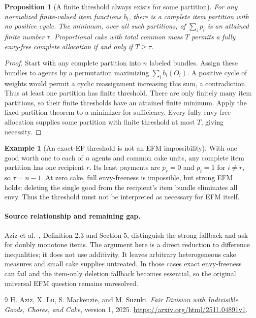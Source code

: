 \documentclass[11pt]{article}
\newtheorem{proposition}{Proposition}
\theoremstyle{definition}
\newtheorem{example}{Example}
\theoremstyle{remark}
\begin{document}
\begin{proposition}[A finite threshold always exists for some partition]
For any normalized finite-valued item functions $b_i$, there is a complete item partition with no positive cycle. The minimum, over all such partitions, of $\sum_i p_i$ is an attained finite number $\tau$. Proportional cake with total common mass $T$ permits a fully envy-free complete allocation if and only if $T\geq\tau$.
\end{proposition}
\begin{proof}
Start with any complete partition into $n$ labeled bundles. Assign these bundles to agents by a permutation maximizing $\sum_i b_i(O_i)$. A positive cycle of weights would permit a cyclic reassignment increasing this sum, a contradiction. Thus at least one partition has finite threshold. There are only finitely many item partitions, so their finite thresholds have an attained finite minimum. Apply the fixed-partition theorem to a minimizer for sufficiency. Every fully envy-free allocation supplies some partition with finite threshold at most $T$, giving necessity.
\end{proof}

\begin{example}[An exact-EF threshold is not an EFM impossibility]
With one good worth one to each of $n$ agents and common cake units, any complete item partition has one recipient $r$. Its least payments are $p_r=0$ and $p_i=1$ for $i\neq r$, so $\tau=n-1$. At zero cake, full envy-freeness is impossible, but strong EFM holds: deleting the single good from the recipient's item bundle eliminates all envy. Thus the threshold must not be interpreted as necessary for EFM itself.
\end{example}

\paragraph{Source relationship and remaining gap.}
Aziz et al.~\cite{source}, Definition 2.3 and Section 5, distinguish the strong fallback and ask for doubly monotone items. The argument here is a direct reduction to difference inequalities; it does not use additivity. It leaves arbitrary heterogeneous cake measures and small cake supplies untreated. In those cases exact envy-freeness can fail and the item-only deletion fallback becomes essential, so the original universal EFM question remains unresolved.

\begin{thebibliography}{9}
 H. Aziz, X. Lu, S. Mackenzie, and M. Suzuki.
\emph{Fair Division with Indivisible Goods, Chores, and Cake}, version 1, 2025.
\url{https://arxiv.org/html/2511.04891v1}.
\end{thebibliography}
\end{document}
